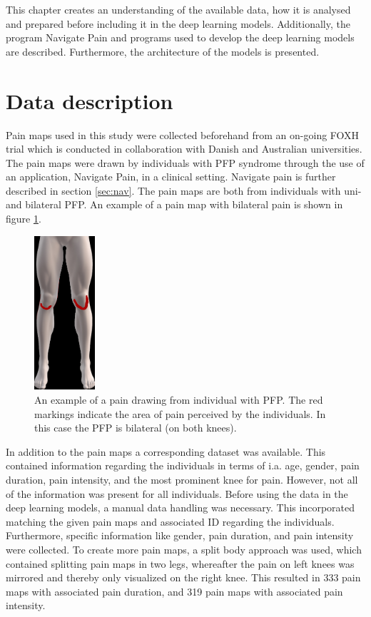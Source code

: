 This chapter creates an understanding of the available data, how it is analysed and prepared before including it in the deep learning models. Additionally, the program Navigate Pain and programs used to develop the deep learning models are described. Furthermore, the architecture of the models is presented.

\section{Data description}
Pain maps used in this study were collected beforehand from an on-going FOXH trial which is conducted in collaboration with Danish and Australian universities. The pain maps were drawn by individuals with PFP syndrome through the use of an application, Navigate Pain, in a clinical setting. Navigate pain is further described in section \ref{sec:nav}. The pain maps are both from individuals with uni- and bilateral PFP. An example of a pain map with bilateral pain is shown in figure \ref{fig:kneepainmap}.

\begin{figure} [H]
\centering
\includegraphics[width=0.2\textwidth]{figures/kneepainmap}
\caption{An example of a pain drawing from individual with PFP. The red markings indicate the area of pain perceived by the individuals. In this case the PFP is bilateral (on both knees).}
\label{fig:kneepainmap}
\end{figure}

\noindent
In addition to the pain maps a corresponding dataset was available. This contained information regarding the individuals in terms of i.a. age, gender, pain duration, pain intensity, and the most prominent knee for pain. However, not all of the information was present for all individuals.
Before using the data in the deep learning models, a manual data handling was necessary. This incorporated matching the given pain maps and associated ID regarding the individuals. Furthermore, specific information like gender, pain duration, and pain intensity were collected.\newline
\noindent
To create more pain maps, a split body approach was used, which contained splitting pain maps in two legs, whereafter the pain on left knees was mirrored and thereby only visualized on the right knee. This resulted in 333 pain maps with associated pain duration, and 319 pain maps with associated pain intensity. 



